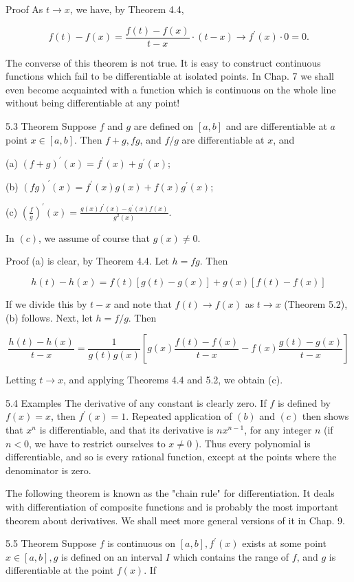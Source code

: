 \documentclass[10pt]{article}
\begin{document}
Proof As $t \rightarrow x$, we have, by Theorem 4.4,

$$
f(t)-f(x)=\frac{f(t)-f(x)}{t-x} \cdot(t-x) \rightarrow f^{\prime}(x) \cdot 0=0 .
$$

The converse of this theorem is not true. It is easy to construct continuous functions which fail to be differentiable at isolated points. In Chap. 7 we shall even become acquainted with a function which is continuous on the whole line without being differentiable at any point!

5.3 Theorem Suppose $f$ and $g$ are defined on $[a, b]$ and are differentiable at $a$ point $x \in[a, b]$. Then $f+g, f g$, and $f / g$ are differentiable at $x$, and

(a) $(f+g)^{\prime}(x)=f^{\prime}(x)+g^{\prime}(x)$;

(b) $(f g)^{\prime}(x)=f^{\prime}(x) g(x)+f(x) g^{\prime}(x)$;

(c) $\left(\frac{f}{g}\right)^{\prime}(x)=\frac{g(x) f^{\prime}(x)-g^{\prime}(x) f(x)}{g^{2}(x)}$.

In $(c)$, we assume of course that $g(x) \neq 0$.

Proof (a) is clear, by Theorem 4.4. Let $h=f g$. Then

$$
h(t)-h(x)=f(t)[g(t)-g(x)]+g(x)[f(t)-f(x)]
$$

If we divide this by $t-x$ and note that $f(t) \rightarrow f(x)$ as $t \rightarrow x$ (Theorem 5.2), (b) follows. Next, let $h=f / g$. Then

$$
\frac{h(t)-h(x)}{t-x}=\frac{1}{g(t) g(x)}\left[g(x) \frac{f(t)-f(x)}{t-x}-f(x) \frac{g(t)-g(x)}{t-x}\right]
$$

Letting $t \rightarrow x$, and applying Theorems 4.4 and 5.2, we obtain (c).

5.4 Examples The derivative of any constant is clearly zero. If $f$ is defined by $f(x)=x$, then $f^{\prime}(x)=1$. Repeated application of $(b)$ and $(c)$ then shows that $x^{n}$ is differentiable, and that its derivative is $n x^{n-1}$, for any integer $n$ (if $n<0$, we have to restrict ourselves to $x \neq 0$ ). Thus every polynomial is differentiable, and so is every rational function, except at the points where the denominator is zero.

The following theorem is known as the "chain rule" for differentiation. It deals with differentiation of composite functions and is probably the most important theorem about derivatives. We shall meet more general versions of it in Chap. 9.

5.5 Theorem Suppose $f$ is continuous on $[a, b], f^{\prime}(x)$ exists at some point $x \in[a, b], g$ is defined on an interval $I$ which contains the range of $f$, and $g$ is differentiable at the point $f(x)$. If
\end{document}

